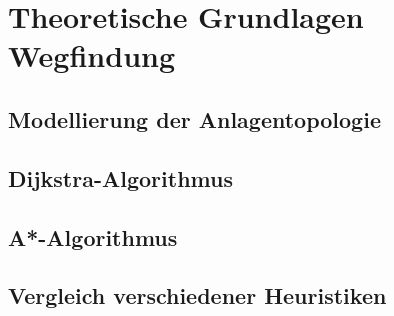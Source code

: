 \chapter{Theoretische Grundlagen Wegfindung}

\section{Modellierung der Anlagentopologie}

\section{Dijkstra-Algorithmus}

\section{A*-Algorithmus}

\section{Vergleich verschiedener Heuristiken}

